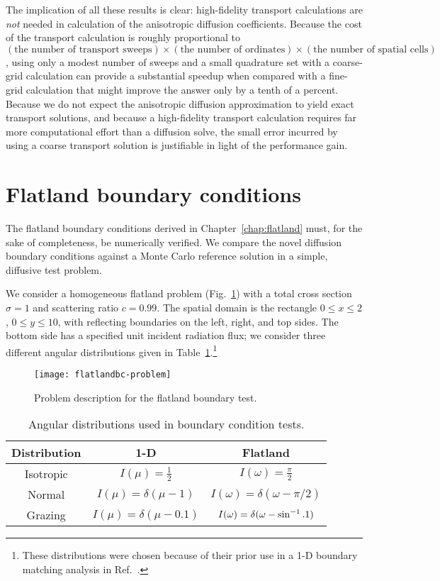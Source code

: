 The implication of all these results is clear: high-fidelity transport
calculations are \emph{not} needed in calculation of the anisotropic diffusion
coefficients. Because the cost of the transport calculation is
roughly proportional to $
  (\text{the number of transport sweeps}) \times 
  (\text{the number of ordinates}) \times 
  (\text{the number of spatial cells})$,
using only a modest number of sweeps and a small quadrature set with a
coarse-grid calculation can provide a substantial speedup when compared with a
fine-grid calculation that might improve the answer only by a tenth of a
percent. Because we do not expect the anisotropic diffusion approximation to
yield exact transport solutions, and because a high-fidelity transport
calculation requires far more computational effort than a diffusion solve, the
small error incurred by using a coarse transport solution is justifiable in
light of the performance gain.

\section{Flatland boundary conditions}\label{sec:nrFlatlandBcs}

The flatland boundary conditions derived in Chapter~\ref{chap:flatland} must,
for the sake of completeness, be numerically verified. We compare the novel
diffusion boundary conditions against a Monte Carlo reference solution in a
simple, diffusive test problem.

We consider a homogeneous flatland problem (Fig.~\ref{fig:flatlandBcProblem})
with a
total cross section $\sigma=1$ and scattering ratio $c=0.99$. The spatial 
domain is the rectangle $0 \le x \le 2$, $0 \le y \le 10$, with
reflecting boundaries on the left,
right, and top sides. The bottom side has a specified unit incident radiation
flux; we consider three different angular
distributions given in Table~\ref{tab:angularDistributions}.\footnote{These
distributions were chosen because of their prior use in a 1-D boundary
matching analysis in Ref.~\cite{Dav2006}.}

\begin{figure}[htb]
  \centering
  \texttt{[image: flatlandbc-problem]}
  \caption{Problem description for the flatland boundary test.}
  \label{fig:flatlandBcProblem}
\end{figure}

\begin{table}[htb]
  \centering
  \begin{tabular}{ccc}
\toprule
    Distribution & 1-D & Flatland
\\ \midrule
Isotropic & $I(\mu) = \frac{1}{2}$ & $I(\omega) = \frac{\pi}{2}$
\\
Normal & $I(\mu) = \delta(\mu-1)$ & $I(\omega) = \delta(\omega-\pi/2)$
\\
Grazing & $I(\mu) = \delta(\mu-0.1)$ & $I(\omega) = \delta(\omega-\sin^{-1}.1)$
\\ \bottomrule
  \end{tabular}
  \caption{Angular distributions used in boundary condition tests.}
  \label{tab:angularDistributions}
\end{table}

